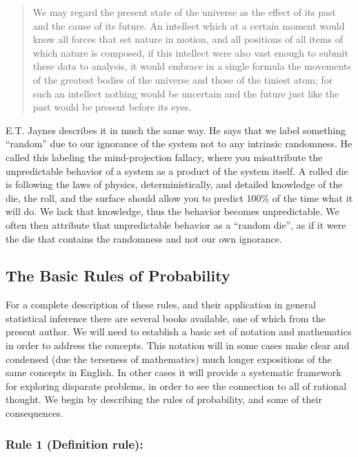 \documentclass{tufte-book}
\begin{document}
\begin{quote}
We may regard the present state of the universe as the effect of its
past and the cause of its future. An intellect which at a certain moment
would know all forces that set nature in motion, and all positions of
all items of which nature is composed, if this intellect were also vast
enough to submit these data to analysis, it would embrace in a single
formula the movements of the greatest bodies of the universe and those
of the tiniest atom; for such an intellect nothing would be uncertain
and the future just like the past would be present before its
eyes.\citep{laplace1825philosophical}
\end{quote}

E.T. Jaynes describes it in much the same way. He says that we label
something ``random'' due to our ignorance of the system not to any
intrinsic randomness. He called this labeling the mind-projection
fallacy\citep{Jaynes2003}, where you misattribute the unpredictable
behavior of a system as a product of the system itself. A rolled die is
following the laws of physics, deterministically, and detailed knowledge
of the die, the roll, and the surface should allow you to predict 100\%
of the time what it will do. We lack that knowledge, thus the behavior
becomes unpredictable. We often then attribute that unpredictable
behavior as a ``random die'', as if it were the die that contains the
randomness and not our own ignorance.

\subsection{The Basic Rules of
Probability}\label{the-basic-rules-of-probability}

For a complete description of these rules, and their application in
general statistical inference there are several books available, one of
which from the present author\citep{Blais:2014aa}. We will need to
establish a basic set of notation and mathematics in order to address
the concepts. This notation will in some cases make clear and condensed
(due the terseness of mathematics) much longer expositions of the same
concepts in English. In other cases it will provide a systematic
framework for exploring disparate problems, in order to see the
connection to all of rational thought. We begin by describing the rules
of probability, and some of their consequences.

\subsubsection{Rule 1 (Definition rule):}\label{rule-1-definition-rule}
\end{document}
